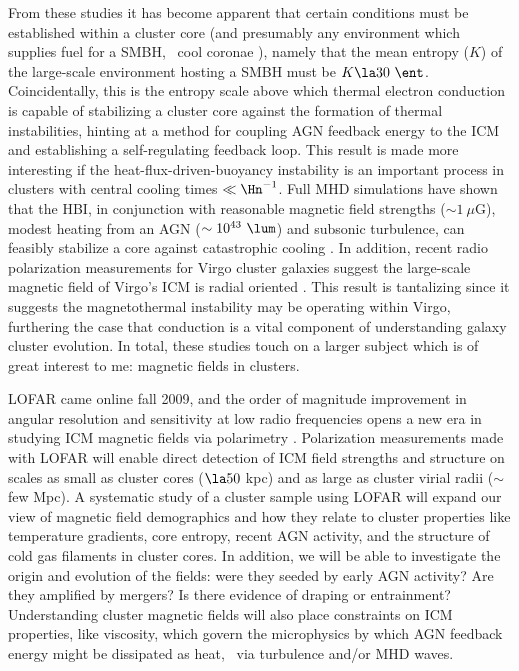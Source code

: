 \documentclass[12pt]{article}
\begin{document}
From these studies it has become apparent that certain conditions must
be established within a cluster core (and presumably any environment
which supplies fuel for a SMBH, \eg\ cool coronae \cite{coronae}),
namely that the mean entropy ($K$) of the large-scale environment
hosting a SMBH must be $K \la 30~\ent$. Coincidentally, this is the
entropy scale above which thermal electron conduction is capable of
stabilizing a cluster core against the formation of thermal
instabilities, hinting at a method for coupling AGN feedback energy to
the ICM and establishing a self-regulating feedback loop. This result
is made more interesting if the heat-flux-driven-buoyancy instability
\cite[HBI,][]{2008ApJ...677L...9P} is an important process in clusters
with central cooling times $\ll \Hn^{-1}$. Full MHD simulations have
shown that the HBI, in conjunction with reasonable magnetic field
strengths ($\sim 1~\mu$G), modest heating from an AGN ($\sim
10^{43}~\lum$) and subsonic turbulence, can feasibly stabilize a core
against catastrophic cooling \cite{2009ApJ...703...96P,
2009arXiv0911.5198R}. In addition, recent radio polarization
measurements for Virgo cluster galaxies suggest the large-scale
magnetic field of Virgo's ICM is radial oriented
\cite{2009arXiv0911.2476P}. This result is tantalizing since it
suggests the magnetothermal instability \cite{2000ApJ...534..420B} may
be operating within Virgo, furthering the case that conduction is a
vital component of understanding galaxy cluster evolution. In total,
these studies touch on a larger subject which is of great interest to
me: magnetic fields in clusters.

LOFAR came online fall 2009, and the order of magnitude improvement in
angular resolution and sensitivity at low radio frequencies opens a
new era in studying ICM magnetic fields via polarimetry
\cite{2009ASPC..407...33A}. Polarization measurements made with LOFAR
will enable direct detection of ICM field strengths and structure on
scales as small as cluster cores ($\la 50$ kpc) and as large as
cluster virial radii ($\sim$ few Mpc). A systematic study of a cluster
sample using LOFAR will expand our view of magnetic field demographics
and how they relate to cluster properties like temperature gradients,
core entropy, recent AGN activity, and the structure of cold gas
filaments in cluster cores. In addition, we will be able to
investigate the origin and evolution of the fields: were they seeded
by early AGN activity? Are they amplified by mergers? Is there
evidence of draping or entrainment? Understanding cluster magnetic
fields will also place constraints on ICM properties, like viscosity,
which govern the microphysics by which AGN feedback energy might be
dissipated as heat, \eg\ via turbulence and/or MHD waves.
\end{document}
